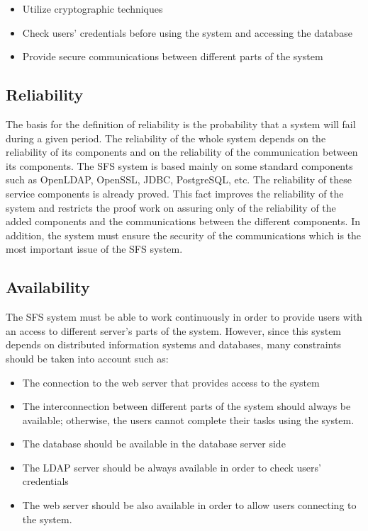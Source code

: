 \begin{itemize}

\item Utilize cryptographic techniques

\item Check users' credentials before using the system and accessing the database

\item Provide secure communications between different parts of the
system

\end{itemize}

\subsection{Reliability}

The basis for the definition of reliability is the probability that
a system will fail during a given period. The reliability of the
whole system depends on the reliability of its components and on the
reliability of the communication between its components. The SFS
system is based mainly on some standard components such as OpenLDAP,
OpenSSL, JDBC, PostgreSQL, etc. The reliability of these service
components is already proved. This fact improves the reliability of
the system and restricts the proof work on assuring only of the
reliability of the added components and the communications between
the different components. In addition, the system must ensure the
security of the communications which is the most important issue of
the SFS system.


\subsection{Availability}

The SFS system must be able to work continuously in order to provide
users with an access to different server's parts of the system.
However, since this system depends on distributed information
systems and databases, many constraints should be taken into account
such as:

\begin{itemize}

\item The connection to the web server that provides access to the
system

\item The interconnection between different parts of the system should
always be available; otherwise, the users cannot complete their
tasks using the system.

\item The database should be available in the database server side

\item The LDAP server should be always available in order to check
users' credentials

\item The web server should be also available in order to allow users
connecting to the system.

\end{itemize}

